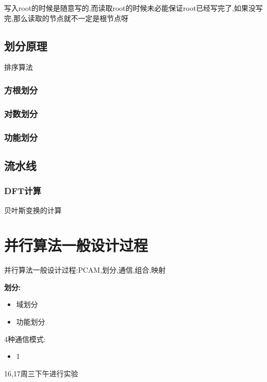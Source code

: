 \documentclass[UTF8,a4paper]{ctexart}
\begin{document}
  {\color{red}写入root的时候是随意写的,而读取root的时候未必能保证root已经写完了,如果没写完,那么读取的节点就不一定是根节点呀}

  \subsection{划分原理}
  排序算法
  \subsubsection{方根划分}
  \subsubsection{对数划分}
  \subsubsection{功能划分}

  \subsection{流水线}
  \subsubsection{DFT计算}
  贝叶斯变换的计算
  \section{并行算法一般设计过程}
  并行算法一般设计过程:PCAM,划分,通信,组合,映射

  \textbf{划分:}
  \begin{itemize}
    \item 域划分
    \item 功能划分
  \end{itemize}

  4种通信模式:
  \begin{itemize}
    \item 1
  \end{itemize}

  {\color{red}16,17周三下午进行实验}
\end{document}
